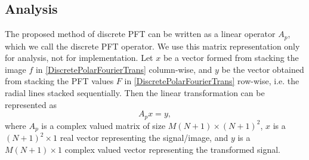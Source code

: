 \documentclass{UCF_ETD}
\begin{document}
 \subsection{Analysis}
 The proposed method of discrete PFT can be written as a linear operator $A_p$, which we call the discrete PFT operator. We use this matrix representation only for analysis, not for implementation. Let $x$ be a vector formed from stacking the image $f$ in \eqref{DiscretePolarFourierTrans} column-wise,
 and $y$ be the vector obtained from stacking the PFT values $F$ in \eqref{DiscretePolarFourierTrans} row-wise, i.e. the radial lines stacked sequentially. Then the linear transformation can be represented as
 \begin{equation} \label{LinearPolarOperatorForm}
  A_p x = y,
 \end{equation}
 where $A_p$ is a complex valued matrix of size ${M(N+1)}\times {(N+1)^2}$, $x$ is a $(N+1)^2 \times 1$ real vector representing the signal/image, and $y$ is a $M(N+1) \times 1$ complex valued vector representing the transformed signal.
 
\end{document}
